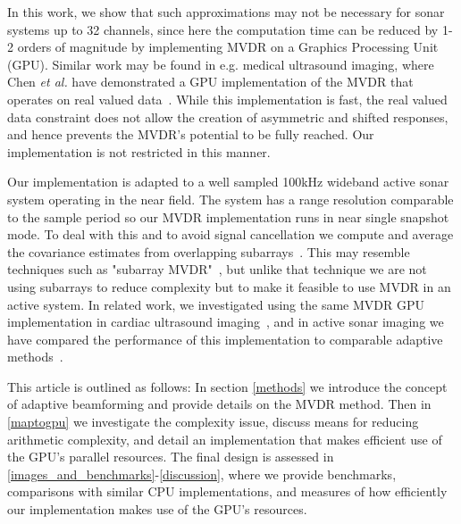 \documentclass[12pt,journal,draftclsnofoot,onecolumn]{IEEEtran}
\newcommand\1{\vec 1}
\begin{document}
% 
% 


In this work, we show that such approximations may not be necessary for sonar systems up to 32 channels, since here the computation time can be reduced by 1-2 orders of magnitude by implementing MVDR on a Graphics Processing Unit (GPU). Similar work may be found in e.g. medical ultrasound imaging, where Chen \emph{et al.} have demonstrated a GPU implementation of the MVDR that operates on real valued data~\cite{Chen2011,Chen2011a}. While this implementation is fast, the real valued data constraint does not allow the creation of asymmetric and shifted responses, and hence prevents the MVDR's potential to be fully reached. Our implementation is not restricted in this manner.

Our implementation is adapted to a well sampled 100\;kHz wideband active sonar system operating in the near field. The system has a range resolution comparable to the sample period so our MVDR implementation runs in near single snapshot mode. To deal with this and to avoid signal cancellation we compute and average the covariance estimates from overlapping subarrays~\cite{Kailath1985}. This may resemble techniques such as "subarray MVDR"~\cite{Chapman1976}, but unlike that technique we are not using subarrays to reduce complexity but to make it feasible to use MVDR in an active system. In related work, we investigated using the same MVDR GPU implementation in cardiac ultrasound imaging~\cite{Asen2012,Asen2013}, and in active sonar imaging we have compared the performance of this implementation to comparable adaptive methods~\cite{Buskenes2013}.

This article is outlined as follows: In section \ref{methods} we introduce the concept of adaptive beamforming and provide details on the MVDR method. Then in \ref{maptogpu} we investigate the complexity issue, discuss means for reducing arithmetic complexity, and detail an implementation that makes efficient use of the GPU's parallel resources. The final design is assessed in \ref{images_and_benchmarks}-\ref{discussion}, where we provide benchmarks, comparisons with similar CPU implementations, and measures of how efficiently our implementation makes use of the GPU's resources.
\end{document}
